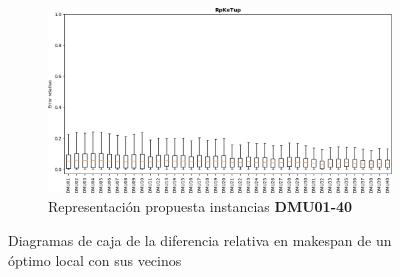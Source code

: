 \begin{figure}[H]\ContinuedFloat
    \begin{subfigure}{\textwidth}
        \centering
        \includegraphics[scale=.6]{Imagenes/bxppr_1.png}
        \caption{Representación propuesta instancias \textbf{DMU01-40}}
    \end{subfigure}
    \caption{Diagramas de caja de la diferencia relativa en makespan de un óptimo local con sus vecinos}
    \label{fig:bxp1}
\end{figure}


